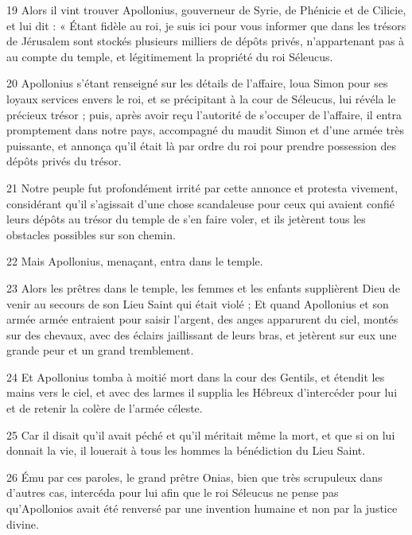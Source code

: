 \par 19 Alors il vint trouver Apollonius, gouverneur de Syrie, de Phénicie et de Cilicie, et lui dit : « Étant fidèle au roi, je suis ici pour vous informer que dans les trésors de Jérusalem sont stockés plusieurs milliers de dépôts privés, n'appartenant pas à au compte du temple, et légitimement la propriété du roi Séleucus.

\par 20 Apollonius s'étant renseigné sur les détails de l'affaire, loua Simon pour ses loyaux services envers le roi, et se précipitant à la cour de Séleucus, lui révéla le précieux trésor ; puis, après avoir reçu l'autorité de s'occuper de l'affaire, il entra promptement dans notre pays, accompagné du maudit Simon et d'une armée très puissante, et annonça qu'il était là par ordre du roi pour prendre possession des dépôts privés du trésor.

\par 21 Notre peuple fut profondément irrité par cette annonce et protesta vivement, considérant qu'il s'agissait d'une chose scandaleuse pour ceux qui avaient confié leurs dépôts au trésor du temple de s'en faire voler, et ils jetèrent tous les obstacles possibles sur son chemin.

\par 22 Mais Apollonius, menaçant, entra dans le temple.

\par 23 Alors les prêtres dans le temple, les femmes et les enfants supplièrent Dieu de venir au secours de son Lieu Saint qui était violé ; Et quand Apollonius et son armée armée entraient pour saisir l'argent, des anges apparurent du ciel, montés sur des chevaux, avec des éclairs jaillissant de leurs bras, et jetèrent sur eux une grande peur et un grand tremblement.

\par 24 Et Apollonius tomba à moitié mort dans la cour des Gentils, et étendit les mains vers le ciel, et avec des larmes il supplia les Hébreux d'intercéder pour lui et de retenir la colère de l'armée céleste.

\par 25 Car il disait qu'il avait péché et qu'il méritait même la mort, et que si on lui donnait la vie, il louerait à tous les hommes la bénédiction du Lieu Saint.

\par 26 Ému par ces paroles, le grand prêtre Onias, bien que très scrupuleux dans d'autres cas, intercéda pour lui afin que le roi Séleucus ne pense pas qu'Apollonios avait été renversé par une invention humaine et non par la justice divine.

